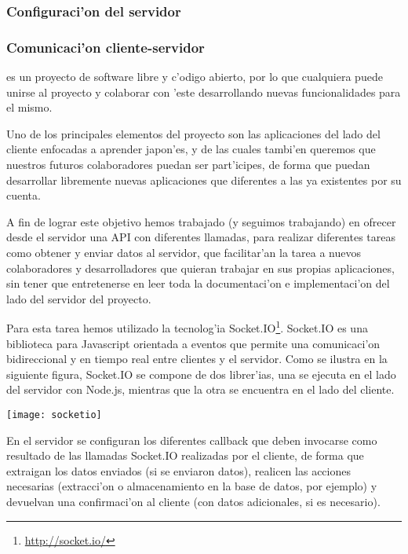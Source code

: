 \subsubsection{Configuraci'on del servidor}
\label{sub:configuracion_del_servidor}

\subsubsection{Comunicaci'on cliente-servidor}
\label{sub:comunicacion_cliente_servidor}

\Nipponline{} es un proyecto de software libre y c'odigo abierto, por lo que cualquiera puede unirse al proyecto y
colaborar con 'este desarrollando nuevas funcionalidades para el mismo.

Uno de los principales elementos del proyecto son las aplicaciones del lado del cliente enfocadas a aprender
japon'es, y de las cuales tambi'en queremos que nuestros futuros colaboradores puedan ser part'icipes, de forma que
puedan desarrollar libremente nuevas aplicaciones que diferentes a las ya existentes por su cuenta.

A fin de lograr este objetivo hemos trabajado (y seguimos trabajando) en ofrecer desde el servidor una API con
diferentes llamadas, para realizar diferentes tareas como obtener y enviar datos al servidor, que facilitar'an la
tarea a nuevos colaboradores y desarrolladores que quieran trabajar en sus propias aplicaciones, sin tener que
entretenerse en leer toda la documentaci'on e implementaci'on del lado del servidor del proyecto.

Para esta tarea hemos utilizado la tecnolog'ia Socket.IO\footnote{\url{http://socket.io/}}. Socket.IO es una 
biblioteca para Javascript orientada a eventos que permite una comunicaci'on bidireccional y en tiempo real 
entre clientes y el servidor. Como se ilustra en la siguiente figura, Socket.IO se compone de dos librer'ias, una se 
ejecuta en el lado del servidor con Node.js, mientras que la otra se encuentra en el lado del cliente.

\begin{center}
\texttt{[image: socketio]}
\end{center}

En el servidor se configuran los diferentes callback que deben invocarse como resultado de las llamadas Socket.IO
realizadas por el cliente, de forma que extraigan los datos enviados (si se enviaron datos), realicen las acciones
necesarias (extracci'on o almacenamiento en la base de datos, por ejemplo) y devuelvan una confirmaci'on al cliente
(con datos adicionales, si es necesario).

